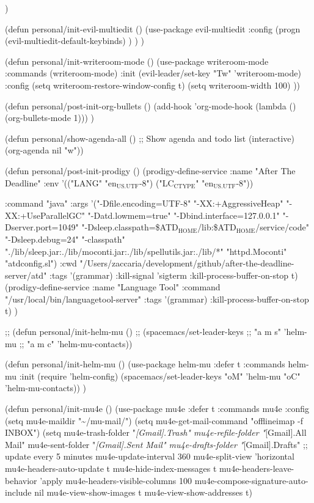 \documentclass[presentation]{beamer}
\begin{document}
{{{{{{)


(defun personal/init-evil-multiedit ()
  (use-package evil-multiedit
    :config
    (progn
      (evil-multiedit-default-keybinds)
      )
    )
  )

(defun personal/init-writeroom-mode ()
  (use-package writeroom-mode
    :commands (writeroom-mode)
    :init
    (evil-leader/set-key "Tw" 'writeroom-mode)
    :config
    (setq writeroom-restore-window-config t)
    (setq writeroom-width 100)
    ))


(defun personal/post-init-org-bullets ()
  (add-hook 'org-mode-hook (lambda () (org-bullets-mode 1)))
  )

(defun personal/show-agenda-all ()
  ;; Show agenda and todo list
  (interactive)
  (org-agenda nil "w"))



(defun personal/post-init-prodigy ()
  (prodigy-define-service
    :name "After The Deadline"
    :env '(("LANG" "en\(_{\text{US.UTF}}\)-8")
           ("LC\(_{\text{CTYPE}}\)" "en\(_{\text{US.UTF}}\)-8"))

  :command "java"
  :args '("-Dfile.encoding=UTF-8" "-XX:+AggressiveHeap" "-XX:+UseParallelGC" "-Datd.lowmem=true" "-Dbind.interface=127.0.0.1" "-Dserver.port=1049" "-Dsleep.classpath=\$ATD\(_{\text{HOME}}\)/lib:\$ATD\(_{\text{HOME}}\)/service/code" "-Dsleep.debug=24" "-classpath" "./lib/sleep.jar:./lib/moconti.jar:./lib/spellutils.jar:./lib/*" "httpd.Moconti" "atdconfig.sl")
  :cwd "/Users/zaccaria/development/github/after-the-deadline-server/atd"
  :tags '(grammar)
  :kill-signal 'sigterm
  :kill-process-buffer-on-stop t)
(prodigy-define-service
  :name "Language Tool"
  :command "/usr/local/bin/languagetool-server"
  :tags '(grammar)
  :kill-process-buffer-on-stop t)
)



;; (defun personal/init-helm-mu ()
;;   (spacemacs/set-leader-keys
;;     "a m s" 'helm-mu
;;     "a m c" 'helm-mu-contacts))

(defun personal/init-helm-mu ()
  (use-package helm-mu
    :defer t
    :commands helm-mu
    :init
    (require 'helm-config)
    (spacemacs/set-leader-keys "oM" 'helm-mu
      "oC" 'helm-mu-contacts))
  ) 


(defun personal/init-mu4e ()
  (use-package mu4e
    :defer t
    :commands mu4e
    :config
    (setq mu4e-maildir "\textasciitilde{}/mu-mail/")
    (setq mu4e-get-mail-command "offlineimap -f INBOX")
    (setq mu4e-trash-folder "\emph{[Gmail].Trash"
          mu4e-refile-folder "}[Gmail].All Mail"
          mu4e-sent-folder "\emph{[Gmail].Sent Mail"
          mu4e-drafts-folder "}[Gmail].Drafts"
          ;; update every 5 minutes
          mu4e-update-interval 360
          mu4e-split-view 'horizontal 
          mu4e-headers-auto-update t
          mu4e-hide-index-messages t
          mu4e-headers-leave-behavior 'apply
          mu4e-headers-visible-columns 100
          mu4e-compose-signature-auto-include nil
          mu4e-view-show-images t
          mu4e-view-show-addresses t)

}}}}}}
\end{document}
